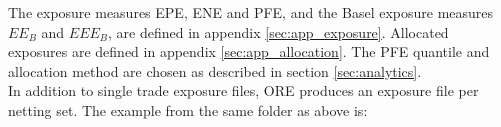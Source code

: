 \documentclass[12pt, a4paper]{article}
\begin{document}
The exposure measures EPE, ENE and PFE, and the Basel exposure measures $EE_B$ and $EEE_B$, are defined in appendix
\ref{sec:app_exposure}. Allocated exposures are defined in appendix \ref{sec:app_allocation}. The PFE quantile and
allocation method are chosen as described in section \ref{sec:analytics}. \\

In addition to single trade exposure files, ORE produces an exposure file per netting set. The example from the same
folder as above is:

\begin{center}
\end{center}
\end{document}
